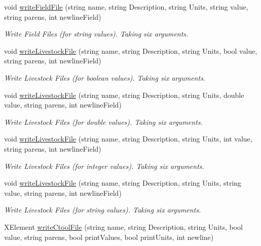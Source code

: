 \begin{DoxyCompactItemize}
void \mbox{\hyperlink{class_global_vars_ac2d4201d9a2624a5810efb9a2fa932e4}{write\+Field\+File}} (string name, string Description, string Units, string value, string parens, int newline\+Field)
\begin{DoxyCompactList}\small\item\em Write Field Files (for string values). Taking six arguments. \end{DoxyCompactList}\item 
void \mbox{\hyperlink{class_global_vars_a2f5e4512e434bc4e930d4030a24cfdfa}{write\+Livestock\+File}} (string name, string Description, string Units, bool value, string parens, int newline\+Field)
\begin{DoxyCompactList}\small\item\em Write Livestock Files (for boolean values). Taking six arguments. \end{DoxyCompactList}\item 
void \mbox{\hyperlink{class_global_vars_a2af5de31bc8a77c058b293e265d35f0c}{write\+Livestock\+File}} (string name, string Description, string Units, double value, string parens, int newline\+Field)
\begin{DoxyCompactList}\small\item\em Write Livestock Files (for double values). Taking six arguments. \end{DoxyCompactList}\item 
void \mbox{\hyperlink{class_global_vars_aaf62c688f97976c0454104445bae83e9}{write\+Livestock\+File}} (string name, string Description, string Units, int value, string parens, int newline\+Field)
\begin{DoxyCompactList}\small\item\em Write Livestock Files (for integer values). Taking six arguments. \end{DoxyCompactList}\item 
void \mbox{\hyperlink{class_global_vars_a42686b916b628d5995b7a62f210925d8}{write\+Livestock\+File}} (string name, string Description, string Units, string value, string parens, int newline\+Field)
\begin{DoxyCompactList}\small\item\em Write Livestock Files (for string values). Taking six arguments. \end{DoxyCompactList}\item 
X\+Element \mbox{\hyperlink{class_global_vars_a286f7606a1d19699b484cd35a5e537a7}{write\+Ctool\+File}} (string name, string Description, string Units, bool value, string parens, bool print\+Values, bool print\+Units, int newline)

\end{DoxyCompactItemize}
